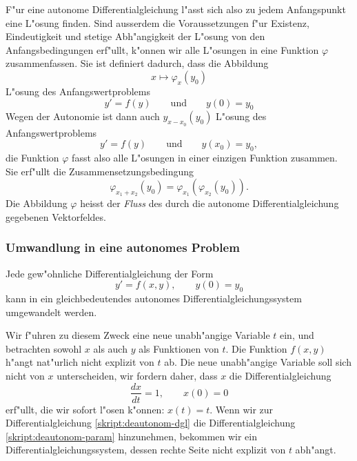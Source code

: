 F"ur eine autonome Differentialgleichung l"asst sich also zu jedem
Anfangspunkt eine L"osung finden.
Sind ausserdem die Voraussetzungen f"ur Existenz, Eindeutigkeit
und stetige Abh"angigkeit der L"osung von den Anfangsbedingungen erf"ullt,
k"onnen wir alle L"osungen in eine Funktion $\varphi$ zusammenfassen.
Sie ist definiert dadurch, dass
die Abbildung
\[
x\mapsto \varphi_x(y_0)
\]
L"osung des Anfangswertproblems
\[
y'=f(y)
\qquad\text{und}\qquad 
y(0)=y_0
\]
Wegen der Autonomie ist dann auch $y_{x-x_0}(y_0)$ L"osung des
Anfangswertproblems
\[
y'=f(y)
\qquad\text{und}\qquad 
y(x_0)=y_0,
\]
die Funktion $\varphi$ fasst also alle L"osungen in einer einzigen
Funktion zusammen.
Sie erf"ullt die Zusammensetzungsbedingung
\[
\varphi_{x_1+x_2}(y_0)=\varphi_{x_1}(\varphi_{x_2}(y_0)).
\]
Die Abbildung $\varphi$ heisst der {\em Fluss} des durch die autonome 
Differentialgleichung gegebenen Vektorfeldes.

\subsubsection{Umwandlung in eine autonomes Problem}
Jede gew"ohnliche Differentialgleichung der Form
\begin{equation}
y'=f(x,y), \qquad y(0)=y_0
\label{skript:deautonom-dgl}
\end{equation}
kann in ein gleichbedeutendes autonomes Differentialgleichungssystem
umgewandelt werden.

Wir f"uhren zu diesem Zweck eine neue unabh"angige Variable $t$ ein,
und betrachten sowohl $x$ als auch $y$ als Funktionen von $t$. 
Die Funktion $f(x,y)$ h"angt nat"urlich nicht explizit von $t$ ab.
Die neue unabh"angige Variable soll sich nicht von $x$ unterscheiden,
wir fordern daher, dass $x$ die Differentialgleichung
\begin{equation}
\frac{dx}{dt}=1,\qquad x(0)=0
\label{skript:deautonom-param}
\end{equation}
erf"ullt, die wir sofort l"osen k"onnen: $x(t)=t$.
Wenn wir zur Differentialgleichung \eqref{skript:deautonom-dgl}
die Differentialgleichung \eqref{skript:deautonom-param} hinzunehmen,
bekommen wir ein Differentialgleichungssystem, dessen rechte Seite
nicht explizit von  $t$ abh"angt.

